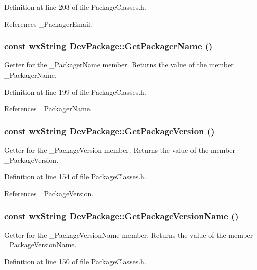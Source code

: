 Definition at line 203 of file Package\-Classes.h.

References \_\-Packager\-Email.
\subsubsection{\setlength{\rightskip}{0pt plus 5cm}const wx\-String Dev\-Package::Get\-Packager\-Name ()\hspace{0.3cm}{\tt  [inline]}}\label{class_dev_package_794e0558a3484e7cc9b557d62a5c3d25}


Getter for the \_\-Packager\-Name member. Returns the value of the member \_\-Packager\-Name. 

Definition at line 199 of file Package\-Classes.h.

References \_\-Packager\-Name.
\subsubsection{\setlength{\rightskip}{0pt plus 5cm}const wx\-String Dev\-Package::Get\-Package\-Version ()\hspace{0.3cm}{\tt  [inline]}}\label{class_dev_package_6765fd306aa9f435ad2f29c29c6f5b52}


Getter for the \_\-Package\-Version member. Returns the value of the member \_\-Package\-Version. 

Definition at line 154 of file Package\-Classes.h.

References \_\-Package\-Version.
\subsubsection{\setlength{\rightskip}{0pt plus 5cm}const wx\-String Dev\-Package::Get\-Package\-Version\-Name ()\hspace{0.3cm}{\tt  [inline]}}\label{class_dev_package_649f85fd98aba05904208c1dddf43049}


Getter for the \_\-Package\-Version\-Name member. Returns the value of the member \_\-Package\-Version\-Name. 

Definition at line 150 of file Package\-Classes.h.

